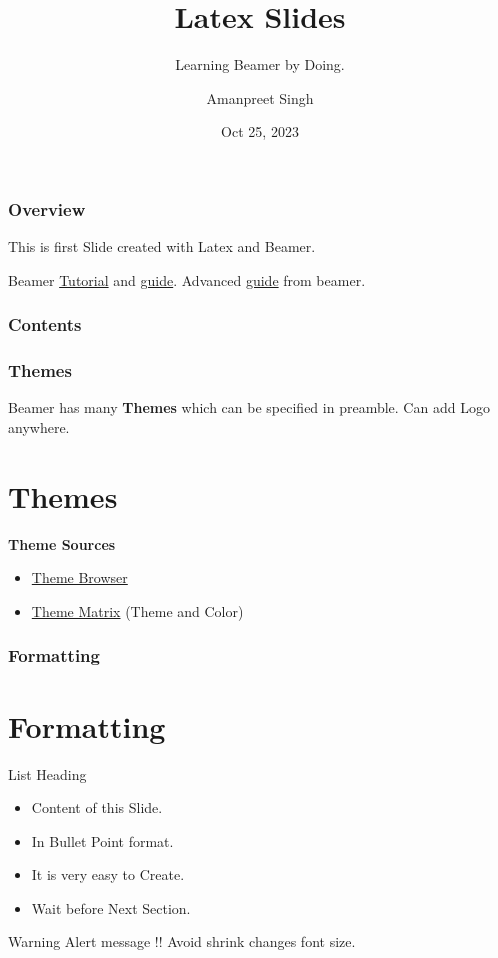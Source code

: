 \documentclass[12pt,[aspectratio=169]{beamer}
\title{Latex Slides}
\subtitle{Learning Beamer by Doing.}
\author{Amanpreet Singh}
\date[Conf 2023] %
{Oct 25, 2023}
\institute[DPS] %
{
  \inst{1}
  Faculty of Physics\\
  Dashmesh Public School
  \and
  \inst{2}
  Faculty of Chemistry\\
  BNMIT
}
\begin{document}
\maketitle

\begin{frame}
\frametitle{Overview}
This is first Slide created with Latex and Beamer.
\break

Beamer \href{https://latex-beamer.com/tutorials/beamer-themes/}{Tutorial} and  \href{https://www.overleaf.com/learn/latex/Beamer}{guide}.
Advanced \href{https://texdoc.org/serve/beamer/0}{guide} from beamer.
\end{frame}

\begin{frame}
    \frametitle{Contents}
    
    \tableofcontents
\end{frame}

\begin{frame}
\frametitle{Themes}
Beamer has many \textbf{Themes} which can be specified in preamble.
Can add Logo \insertlogo \space anywhere.
\break
\section{Themes}
\textbf{Theme Sources}
\begin{itemize}
    \item \href{https://deic.uab.cat/~iblanes/beamer_gallery/index_by_theme.html}{Theme Browser}
    \item \href{https://hartwork.org/beamer-theme-matrix/}{Theme Matrix} (Theme and Color)
\end{itemize}

\end{frame}

\begin{frame}
    \frametitle{Formatting}
    \section{Formatting}
    List Heading
    \begin{itemize}
        \item Content of this Slide.
        \item In Bullet Point format.
        \item It is very easy to Create.
        \item Wait before Next Section.\pause
    \end{itemize}

    \begin{alert}{Warning}
        Alert message !! Avoid shrink changes font size.
    \end{alert}

\end{frame}
\end{document}
